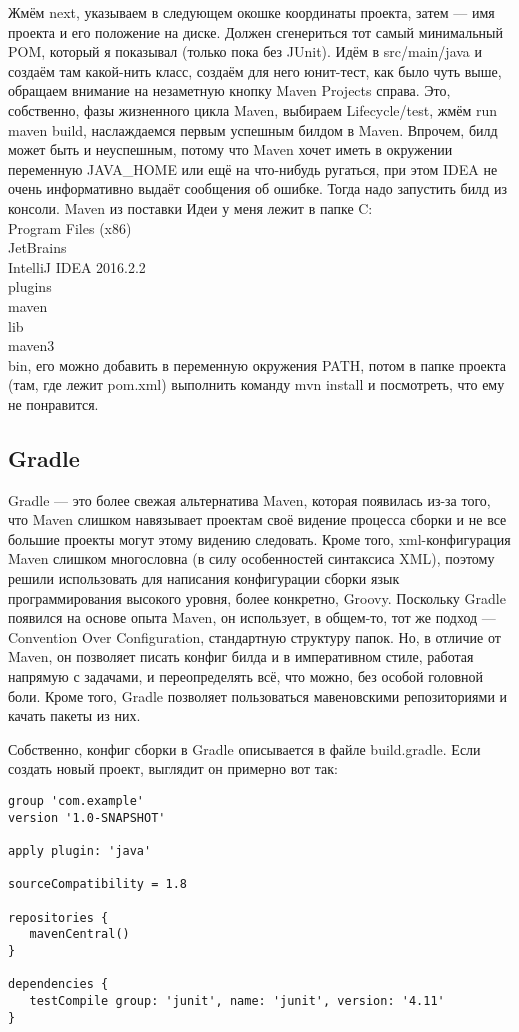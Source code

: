 \documentclass[a5paper]{article}
\begin{document}
Жмём next, указываем в следующем окошке координаты проекта, затем --- имя проекта и его положение на диске. Должен сгенериться тот самый минимальный POM, который я показывал (только пока без JUnit). Идём в src/main/java и создаём там какой-нить класс, создаём для него юнит-тест, как было чуть выше, обращаем внимание на незаметную кнопку Maven Projects справа. Это, собственно, фазы жизненного цикла Maven, выбираем Lifecycle/test, жмём run maven build, наслаждаемся первым успешным билдом в Maven. Впрочем, билд может быть и неуспешным, потому что Maven хочет иметь в окружении переменную JAVA\_HOME или ещё на что-нибудь ругаться, при этом IDEA не очень информативно выдаёт сообщения об ошибке. Тогда надо запустить билд из консоли. Maven из поставки Идеи у меня лежит в папке C:\\Program Files (x86)\\JetBrains\\IntelliJ IDEA 2016.2.2\\plugins\\maven\\lib\\maven3\\bin, его можно добавить в переменную окружения PATH, потом в папке проекта (там, где лежит pom.xml) выполнить команду mvn install и посмотреть, что ему не понравится.

\subsection{Gradle}

Gradle --- это более свежая альтернатива Maven, которая появилась из-за того, что Maven слишком навязывает проектам своё видение процесса сборки и не все большие проекты могут этому видению следовать. Кроме того, xml-конфигурация Maven слишком многословна (в силу особенностей синтаксиса XML), поэтому решили использовать для написания конфигурации сборки язык программирования высокого уровня, более конкретно, Groovy. Поскольку Gradle появился на основе опыта Maven, он использует, в общем-то, тот же подход --- Convention Over Configuration, стандартную структуру папок. Но, в отличие от Maven, он позволяет писать конфиг билда и в императивном стиле, работая напрямую с задачами, и переопределять всё, что можно, без особой головной боли. Кроме того, Gradle позволяет пользоваться мавеновскими репозиториями и качать пакеты из них.

Собственно, конфиг сборки в Gradle описывается в файле build.gradle. Если создать новый проект, выглядит он примерно вот так:
\begin{verbatim}
group 'com.example'
version '1.0-SNAPSHOT'

apply plugin: 'java'

sourceCompatibility = 1.8

repositories {
   mavenCentral()
}

dependencies {
   testCompile group: 'junit', name: 'junit', version: '4.11'
}
\end{verbatim}
\end{document}
